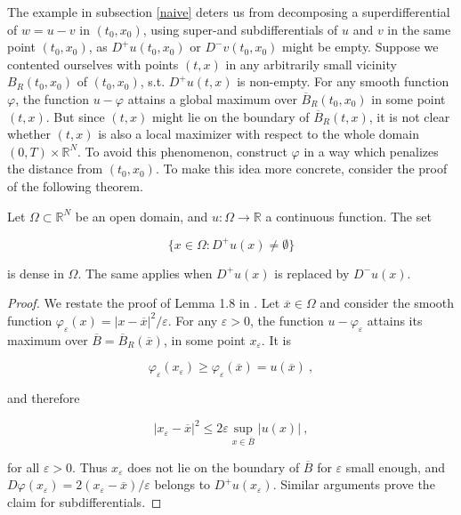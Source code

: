 The example in subsection \ref{naive} deters us from decomposing a superdifferential of $ w = u - v $ in $ (t_0, x_0) $, using super-and subdifferentials of $ u $ and $ v $ in the same point $ (t_0, x_0) $, as $ D^{+}u(t_0, x_0) $ or $ D^{-}v(t_0, x_0) $ might be empty. Suppose we contented ourselves with points $ (t, x) $ in any arbitrarily small vicinity $ B_R(t_0, x_0) $ of $ (t_0, x_0) $, s.t. $ D^{+}u(t, x) $ is non-empty. For any smooth function $ \varphi $, the function $ u - \varphi $ attains a global maximum over $ \overline{B}_R(t_0, x_0) $ in some point $ (t, x) $. But since $ (t, x) $ might lie on the boundary of $ \overline{B}_R(t, x) $, it is not clear whether $ (t, x) $ is also a local maximizer with respect to the whole domain $ \left( 0, T \right) \times \mathbb{R}^{N} $. To avoid this phenomenon, construct $ \varphi $ in a way which penalizes the distance from $ (t_0, x_0) $. To make this idea more concrete, consider the proof of the following theorem.
		
		\begin{theorem}
			\label{density}
			Let $ \Omega \subset \mathbb{R}^{N} $ be an open domain, and $ u : \Omega \to \mathbb{R} $ a continuous function. The set
			
			\begin{equation*}
				\big\{ x \in \Omega : D^{+}u(x) \neq \emptyset \big\}
			\end{equation*}
			
			is dense in $ \Omega $. The same applies when $ D^{+}u(x) $ is replaced by $ D^{-}u(x) $.
			
			\begin{proof}
				We restate the proof of Lemma 1.8 in \cite[p.~30]{bardi2008optimal}. Let $ \overline{x} \in \Omega $ and consider the smooth function $ \varphi_{\varepsilon}(x) = \lvert x - \overline{x} \rvert^2 /  \varepsilon $. For any $ \varepsilon > 0 $, the function $ u - \varphi_{\varepsilon} $ attains its maximum over $ \overline{B} = \overline{B}_R(\overline{x}) $, in some point $ x_{\varepsilon} $. It is
				
				\begin{equation*}
					\varphi_{\varepsilon}(x_{\varepsilon}) \geq \varphi_{\varepsilon}(\overline{x}) = u(\overline{x}) \ ,
				\end{equation*}
				
				and therefore
				
				\begin{equation*}
					\lvert x_{\varepsilon} - \overline{x} \rvert^2 \leq 2 \varepsilon \sup\limits_{x \in \overline{B}} \lvert u(x) \rvert  \ ,
				\end{equation*}
				
				for all $ \varepsilon > 0 $. Thus $ x_{\varepsilon} $ does not lie on the boundary of $ \overline{B} $ for $ \varepsilon $ small enough, and $ D\varphi(x_{\varepsilon}) = 2(x_{\varepsilon} - \overline{x}) / \varepsilon $ belongs to $ D^{+}u(x_{\varepsilon}) $. Similar arguments prove the claim for subdifferentials.
			\end{proof}
		\end{theorem}
	
